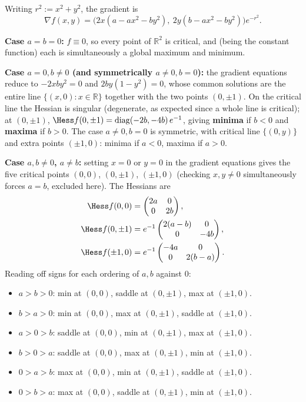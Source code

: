 \begin{exercisesolution}
\label{sol:critical_points_parameterized_gaussian}
Writing $r^2 := x^2+y^2$, the gradient is
\[\nabla f(x,y) = \big(2x(a-ax^2-by^2),\ 2y(b-ax^2-by^2)\big)e^{-r^2}.\]

\textbf{Case $a=b=0$:} $f \equiv 0$, so every point of $\mathbb{R}^2$ is critical, and (being the
constant function) each is simultaneously a global maximum and minimum.

\textbf{Case $a=0, b\neq 0$ (and symmetrically $a \neq 0, b=0$):} the gradient equations reduce to
$-2xby^2=0$ and $2by(1-y^2)=0$, whose common solutions are the entire line $\{(x,0): x\in
\mathbb{R}\}$ together with the two points $(0,\pm1)$. On the critical line the Hessian is
singular (degenerate, as expected since a whole line is critical); at $(0,\pm1)$,
$\Hess f(0,\pm1) = \operatorname{diag}(-2b,-4b)\,e^{-1}$, giving \textbf{minima} if $b<0$ and
\textbf{maxima} if $b>0$. The case $a\neq0,b=0$ is symmetric, with critical line $\{(0,y)\}$ and
extra points $(\pm1,0)$: minima if $a<0$, maxima if $a>0$.

\textbf{Case $a,b \neq 0$, $a \neq b$:} setting $x=0$ or $y=0$ in the gradient equations gives the
five critical points $(0,0)$, $(0,\pm1)$, $(\pm1,0)$ (checking $x,y\neq0$ simultaneously forces
$a=b$, excluded here). The Hessians are
\begin{align*}
\Hess f(0,0) &= \begin{pmatrix}2a&0\\0&2b\end{pmatrix}, \\
\Hess f(0,\pm1) &= e^{-1}\begin{pmatrix}2(a-b)&0\\0&-4b\end{pmatrix}, \\
\Hess f(\pm1,0) &= e^{-1}\begin{pmatrix}-4a&0\\0&2(b-a)\end{pmatrix}.
\end{align*}
Reading off signs for each ordering of $a,b$ against $0$:
\begin{itemize}
  \item $a>b>0$: min at $(0,0)$, saddle at $(0,\pm1)$, max at $(\pm1,0)$.
  \item $b>a>0$: min at $(0,0)$, max at $(0,\pm1)$, saddle at $(\pm1,0)$.
  \item $a>0>b$: saddle at $(0,0)$, min at $(0,\pm1)$, max at $(\pm1,0)$.
  \item $b>0>a$: saddle at $(0,0)$, max at $(0,\pm1)$, min at $(\pm1,0)$.
  \item $0>a>b$: max at $(0,0)$, min at $(0,\pm1)$, saddle at $(\pm1,0)$.
  \item $0>b>a$: max at $(0,0)$, saddle at $(0,\pm1)$, min at $(\pm1,0)$.
\end{itemize}


\end{exercisesolution}
